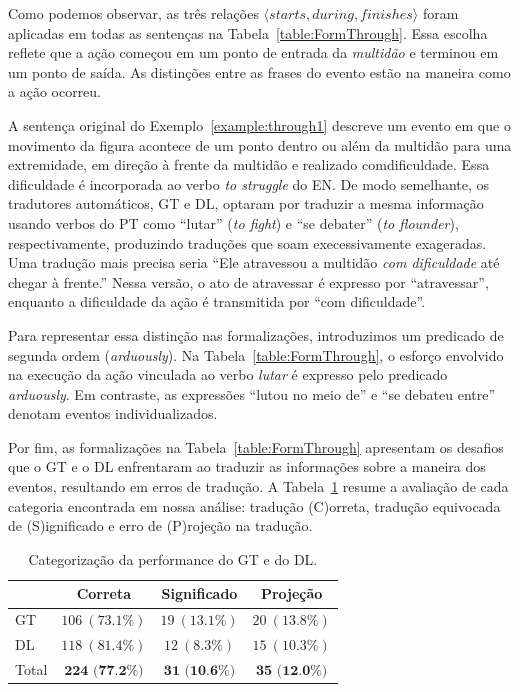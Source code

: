 \documentclass[a4paper, twocolumn, 11pt, twoside]{article}
\begin{document}
  Como podemos observar, as três relações $\langle starts, during, finishes\rangle$ foram aplicadas
  em todas as sentenças na Tabela~\ref{table:FormThrough}. Essa escolha reflete que a ação começou em um ponto de entrada da \textit{multidão} 
  e terminou em um ponto de saída. As distinções entre as frases do evento estão na maneira como a ação ocorreu.

A sentença original do Exemplo~\ref{example:through1} descreve um evento em que o movimento da figura acontece 
de um ponto dentro ou além da multidão para uma extremidade, em direção à frente da multidão e realizado comdificuldade. 
 Essa dificuldade é incorporada ao verbo \textit{to struggle} do EN. De modo semelhante, os tradutores automáticos, GT e DL, 
optaram por traduzir a mesma informação usando verbos do PT como ``lutar'' (\textit{to fight}) e ``se debater'' (\textit{to flounder}),
respectivamente, produzindo traduções que soam execessivamente exageradas. Uma tradução mais precisa seria 
``Ele atravessou a multidão \emph{com dificuldade} até chegar à frente.'' Nessa versão, o ato de atravessar é expresso por ``atravessar'', 
enquanto a dificuldade da ação é transmitida por ``com dificuldade''.

Para representar essa distinção nas formalizações, introduzimos um predicado de segunda ordem (\textit{arduously}). 
Na Tabela~\ref{table:FormThrough}, o esforço envolvido na execução da ação vinculada ao verbo \textit{lutar} é expresso pelo predicado \textit{arduously}. 
Em contraste, as expressões ``lutou no meio de'' e ``se debateu entre'' denotam eventos individualizados.

Por fim, as formalizações na Tabela~\ref{table:FormThrough} apresentam os desafios que o GT e o DL enfrentaram ao traduzir as informações sobre a maneira dos eventos, 
resultando em erros de tradução. A Tabela~\ref{table:GT_DL_Errors} resume a avaliação de cada categoria encontrada em nossa análise: 
tradução (C)orreta, tradução equivocada de (S)ignificado e erro de (P)rojeção na tradução.

\begin{table}[ht]
  \centering
  \footnotesize
  \begin{tabular}{|l|c|c|c|}
  \hline
  & \textbf{Correta} & \textbf{Significado} & \textbf{Projeção} \\
  \hline\hline
  GT & $106~(73.1\%)$ & $19~(13.1\%)$ &  $20~(13.8\%)$\\ \hline
  DL & $118~(81.4\%)$ & $12~(8.3\%)$ &$15~(10.3\%)$ \\ \hline
  Total & $\textbf{224~(77.2\%)}$ & $\textbf{31~(10.6\%)}$ & $\textbf{35~(12.0\%)}$ \\ \hline
  \end{tabular}
  \caption{Categorização da performance do GT e do DL.}
  \label{table:GT_DL_Errors}
  \end{table}
\end{document}
